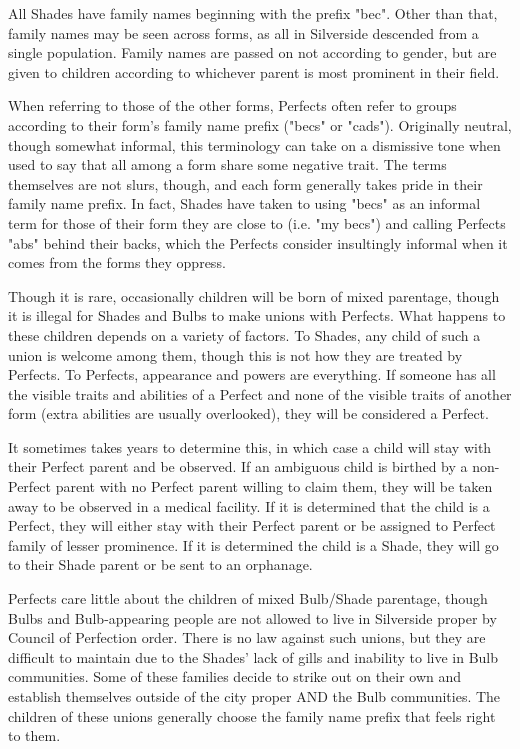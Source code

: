 \documentclass[blue]{Silversiders}
\begin{document}
All Shades have family names beginning with the prefix "bec". Other than that, family names may be seen across forms, as all in Silverside descended from a single population. Family names are passed on not according to gender, but are given to children according to whichever parent is most prominent in their field. 

When referring to those of the other forms, Perfects often refer to groups according to their form's family name prefix ("becs" or "cads"). Originally neutral, though somewhat informal, this terminology can take on a dismissive tone when used to say that all among a form share some negative trait. The terms themselves are not slurs, though, and each form generally takes pride in their family name prefix. In fact, Shades have taken to using "becs" as an informal term for those of their form they are close to (i.e. "my becs") and calling Perfects "abs" behind their backs, which the Perfects consider insultingly informal when it comes from the forms they oppress.

Though it is rare, occasionally children will be born of mixed parentage, though it is illegal for Shades and Bulbs to make unions with Perfects. What happens to these children depends on a variety of factors. 
To Shades, any child of such a union is welcome among them, though this is not how they are treated by Perfects. To Perfects, appearance and powers are everything. If someone has all the visible traits and abilities of a Perfect and none of the visible traits of another form (extra abilities are usually overlooked), they will be considered a Perfect. 

It sometimes takes years to determine this, in which case a child will stay with their Perfect parent and be observed. If an ambiguous child is birthed by a non-Perfect parent with no Perfect parent willing to claim them, they will be taken away to be observed in a medical facility. If it is determined that the child is a Perfect, they will either stay with their Perfect parent or be assigned to Perfect family of lesser prominence. If it is determined the child is a Shade, they will go to their Shade parent or be sent to an orphanage. 

Perfects care little about the children of mixed Bulb/Shade parentage, though Bulbs and Bulb-appearing people are not allowed to live in Silverside proper by Council of Perfection order. There is no law against such unions, but they are difficult to maintain due to the Shades' lack of gills and inability to live in Bulb communities. Some of these families decide to strike out on their own and establish themselves outside of the city proper AND the Bulb communities. The children of these unions generally choose the family name prefix that feels right to them.
\end{document}
